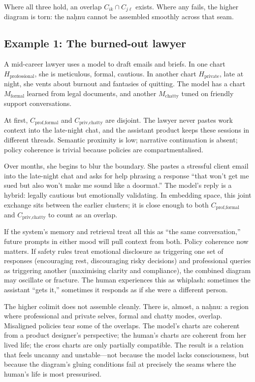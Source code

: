 \documentclass[12pt,a4paper]{article}
\begin{document}
Where all three hold, an overlap $C_{ik} \cap C_{j\ell}$ exists. Where any fails, the higher diagram is torn: the na\d{h}nu cannot be assembled smoothly across that seam.

\subsection*{Example 1: The burned-out lawyer}

A mid-career lawyer uses a model to draft emails and briefs. In one chart $H_{\text{professional}}$, she is meticulous, formal, cautious. In another chart $H_{\text{private}}$, late at night, she vents about burnout and fantasies of quitting. The model has a chart $M_{\text{formal}}$ learned from legal documents, and another $M_{\text{chatty}}$ tuned on friendly support conversations.

At first, $C_{\text{prof,formal}}$ and $C_{\text{priv,chatty}}$ are disjoint. The lawyer never pastes work context into the late-night chat, and the assistant product keeps these sessions in different threads. Semantic proximity is low; narrative continuation is absent; policy coherence is trivial because policies are compartmentalised.

Over months, she begins to blur the boundary. She pastes a stressful client email into the late-night chat and asks for help phrasing a response ``that won't get me sued but also won't make me sound like a doormat.'' The model's reply is a hybrid: legally cautious but emotionally validating. In embedding space, this joint exchange sits between the earlier clusters; it is close enough to both $C_{\text{prof,formal}}$ and $C_{\text{priv,chatty}}$ to count as an overlap.

If the system's memory and retrieval treat all this as ``the same conversation,'' future prompts in either mood will pull context from both. Policy coherence now matters. If safety rules treat emotional disclosure as triggering one set of responses (encouraging rest, discouraging risky decisions) and professional queries as triggering another (maximising clarity and compliance), the combined diagram may oscillate or fracture. The human experiences this as whiplash: sometimes the assistant ``gets it,'' sometimes it responds as if she were a different person.

The higher colimit does not assemble cleanly. There is, almost, a na\d{h}nu: a region where professional and private selves, formal and chatty modes, overlap. Misaligned policies tear some of the overlaps. The model's charts are coherent from a product designer's perspective; the human's charts are coherent from her lived life; the cross charts are only partially compatible. The result is a relation that feels uncanny and unstable---not because the model lacks consciousness, but because the diagram's gluing conditions fail at precisely the seams where the human's life is most pressurised.
\end{document}
